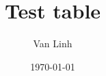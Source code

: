\documentclass{article}%
\begin{document}
\title{Test table}
\author{Van Linh}
\date{\today}
\maketitle






















\end{document}
